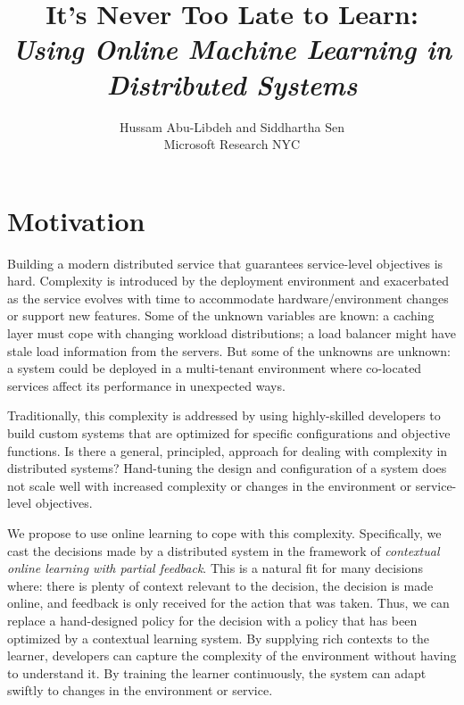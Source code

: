 \documentclass[letterpaper,twocolumn]{article}
\title{
  It's Never Too Late to Learn:\\
  \emph{Using Online Machine Learning in Distributed Systems}
}
\author{Hussam Abu-Libdeh and Siddhartha Sen \\ \small{Microsoft Research NYC}}
\date{}
\newcommand{\ignore}[1]{}
\begin{document}
\maketitle

\section{Motivation}

Building a modern distributed service that guarantees service-level objectives
is hard. Complexity is introduced by the deployment environment and exacerbated
as the service evolves with time to accommodate hardware/environment changes or
support new features. Some of the unknown variables are known: a caching layer
must cope with changing workload distributions; a load balancer might have stale
load information from the servers. But some of the unknowns are unknown: a
system could be deployed in a multi-tenant environment where co-located
services affect its performance in unexpected ways.

\ignore{
For example, to build a simple caching layer that guarantees a certain hit rate,
response latency, and throughput, developers need to take into account the
expected workload accessing the cache, the number of machines available to run
it, the network connecting these machines, the storage hierarchy within each
machine, and interference from other applications running on the network and
machines.  A change in any one of these factors could render the service
woefully inefficient.
}

Traditionally, this complexity is addressed by using highly-skilled developers
to build custom systems that are optimized for specific configurations and
objective functions.  Is there a general, principled, approach for dealing with
complexity in distributed systems? Hand-tuning the design and configuration of a
system does not scale well with increased complexity or changes in the
environment or service-level objectives.

We propose to use online learning to cope with this complexity. Specifically, we
cast the decisions made by a distributed system in the framework of
{\em contextual online learning with partial feedback}.  This is a natural fit
for many decisions where: there is plenty of context relevant to the decision, the
decision is made online, and feedback is only received for the action that
was taken.  Thus, we can replace a hand-designed policy for the decision with a
policy that has been optimized by a contextual learning system. By supplying
rich contexts to the learner, developers can capture the complexity of the
environment without having to understand it.  By training the learner
continuously, the system can adapt swiftly to changes in the environment
or service.
\end{document}
